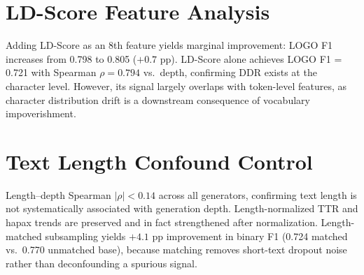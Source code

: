 \documentclass[11pt]{article}
\begin{document}
\section{LD-Score Feature Analysis}
\label{app:ld}

Adding LD-Score as an 8th feature yields marginal improvement: LOGO F1 increases from 0.798 to 0.805 ($+0.7$ pp). LD-Score alone achieves LOGO F1 = 0.721 with Spearman $\rho = 0.794$ vs.\ depth, confirming DDR exists at the character level. However, its signal largely overlaps with token-level features, as character distribution drift is a downstream consequence of vocabulary impoverishment.

\section{Text Length Confound Control}
\label{app:length}

Length--depth Spearman $|\rho| < 0.14$ across all generators, confirming text length is not systematically associated with generation depth. Length-normalized TTR and hapax trends are preserved and in fact strengthened after normalization. Length-matched subsampling yields $+4.1$ pp improvement in binary F1 (0.724 matched vs.\ 0.770 unmatched base), because matching removes short-text dropout noise rather than deconfounding a spurious signal.

\end{document}
